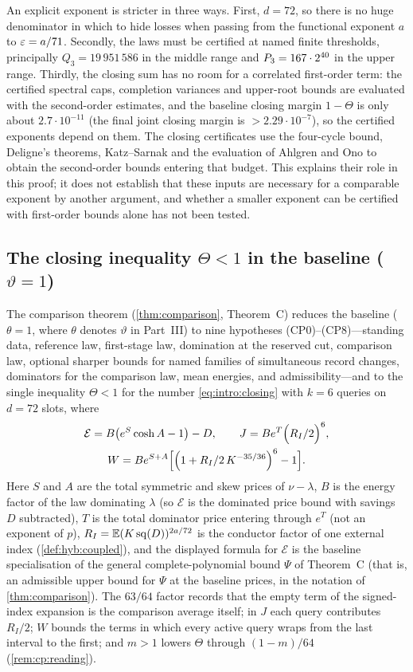 An explicit exponent is stricter in three ways. First, $d=72$, so there
is no huge denominator in which to hide losses when passing from the
functional exponent $a$ to $\varepsilon=a/71$. Secondly, the laws must be
certified at named finite thresholds, principally $Q_3=19\,951\,586$ in
the middle range and $P_3=167\cdot2^{40}$ in the upper range. Thirdly,
the closing sum has no room for a correlated first-order term: the certified
spectral caps, completion variances and upper-root bounds are evaluated
with the second-order estimates, and the baseline closing margin
$1-\Theta$ is only about $2.7\cdot10^{-11}$ (the final joint closing
margin is $>2.29\cdot10^{-7}$), so the certified exponents depend on
them. The closing certificates use the four-cycle bound, Deligne's
theorems, Katz--Sarnak and the evaluation of Ahlgren and Ono to obtain the
second-order bounds entering that budget. This
explains their role in this proof; it does not establish that these
inputs are necessary for a comparable exponent by another argument, and
whether a smaller exponent can be certified with first-order bounds alone
has not been tested.

\subsection{The closing inequality \texorpdfstring{$\Theta<1$}{Theta<1} in the baseline (\texorpdfstring{$\vartheta=1$}{vartheta=1})}\label{subsec:intro:inequality}

The comparison theorem (\cref{thm:comparison}, Theorem~C) reduces the
baseline ($\theta=1$, where $\theta$ denotes $\vartheta$ in Part~III)
to nine hypotheses (CP0)--(CP8)---standing data, reference law,
first-stage law, domination at the reserved cut, comparison law,
optional sharper bounds for named families of simultaneous record
changes, dominators for the comparison law,
mean energies, and admissibility---and to the single inequality
$\Theta<1$ for the number \eqref{eq:intro:closing} with $k=6$ queries
on $d=72$ slots, where
\begin{gather*}
 \mathcal E=B\bigl(e^S\cosh A-1\bigr)-D,\qquad
 J=Be^T\Bigl(R_I/2\Bigr)^6,\\
 W=Be^{S+A}\Bigl[\Bigl(1+R_I/2\,K^{-35/36}\Bigr)^6-1\Bigr].
\end{gather*}
Here $S$ and $A$ are the total symmetric and skew prices of
$\nu-\lambda$, $B$ is the energy factor of the law dominating
$\lambda$ (so $\mathcal E$ is the dominated price bound with savings
$D$ subtracted), $T$ is the total dominator price entering through
$e^T$ (not an exponent of $p$), $R_I=\mathbb E(K\operatorname{sq}(D))^{2a/72}$
is the conductor factor of one external index (\cref{def:hyb:coupled}),
and the displayed formula for $\mathcal E$ is the baseline
specialisation of the general complete-polynomial bound $\Psi$ of
Theorem~C (that is, an admissible upper bound for $\Psi$ at the
baseline prices, in the notation of \cref{thm:comparison}). The $63/64$ factor records that the empty term of
the signed-index expansion is the comparison average itself; in $J$
each query contributes $R_I/2$; $W$ bounds the terms in which every
active query wraps from the last interval to the first; and $m>1$
lowers $\Theta$ through $(1-m)/64$ (\cref{rem:cp:reading}).

